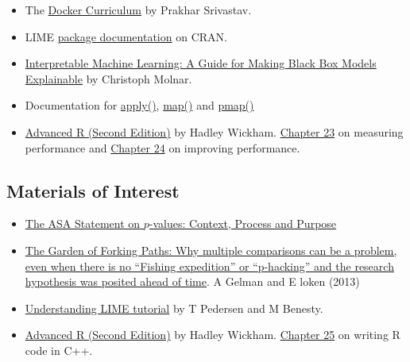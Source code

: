 \documentclass[
  12pt,
]{book}
\begin{document}
\begin{itemize}
\item
  The \href{https://docker-curriculum.com/}{Docker Curriculum} by Prakhar Srivastav.
\item
  LIME \href{https://cran.r-project.org/web/packages/lime/index.html}{package documentation} on CRAN.
\item
  \href{https://christophm.github.io/interpretable-ml-book/}{Interpretable Machine Learning: A Guide for Making Black Box Models Explainable} by Christoph Molnar.
\item
  Documentation for \href{https://www.rdocumentation.org/packages/base/versions/3.6.2/topics/apply}{apply()}, \href{https://purrr.tidyverse.org/reference/map.html}{map()} and \href{https://furrr.futureverse.org/}{pmap()}
\item
  \href{https://adv-r.hadley.nz/index.html}{Advanced R (Second Edition)} by Hadley Wickham. \href{https://adv-r.hadley.nz/perf-measure.html}{Chapter 23} on measuring performance and \href{https://adv-r.hadley.nz/perf-improve.html}{Chapter 24} on improving performance.
\end{itemize}

\hypertarget{materials-of-interest-3}{%
\subsection*{Materials of Interest}\label{materials-of-interest-3}}

\begin{itemize}
\item
  \href{https://library-search.imperial.ac.uk/discovery/fulldisplay?docid=cdi_informaworld_taylorfrancis_310_1080_00031305_2016_1154108\&context=PC\&vid=44IMP_INST:ICL_VU1\&lang=en\&search_scope=MyInst_and_CI\&adaptor=Primo\%20Central\&tab=Everything\&query=any,contains,ASA\%20p-value\&offset=0}{The ASA Statement on \(p\)-values: Context, Process and Purpose}
\item
  \href{http://stat.columbia.edu/~gelman/research/unpublished/forking.pdf}{The Garden of Forking Paths: Why multiple comparisons can be a problem,
  even when there is no ``Fishing expedition'' or ``p-hacking'' and the research
  hypothesis was posited ahead of time}. A Gelman and E loken (2013)
\item
  \href{https://cran.r-project.org/web/packages/lime/vignettes/Understanding_lime.html}{Understanding LIME tutorial} by T Pedersen and M Benesty.
\item
  \href{https://adv-r.hadley.nz/index.html}{Advanced R (Second Edition)} by Hadley Wickham. \href{https://adv-r.hadley.nz/rcpp.html}{Chapter 25} on writing R code in C++.
\end{itemize}
\end{document}

